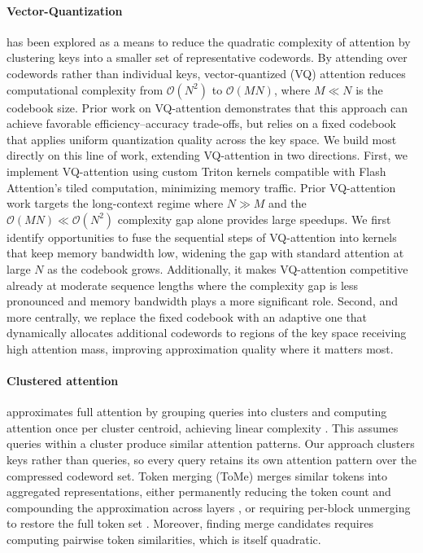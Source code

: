 \paragraph{Vector-Quantization}
has been explored as a means to reduce the quadratic complexity of attention by clustering keys into a smaller set of representative codewords. By attending over codewords rather than individual keys, vector-quantized (VQ) attention reduces computational complexity from $\mathcal{O}(N^2)$ to $\mathcal{O}(MN)$, where $M \ll N$ is the codebook size. Prior work on VQ-attention \cite{lingletransformer} demonstrates that this approach can achieve favorable efficiency–accuracy trade-offs, but relies on a fixed codebook that applies uniform quantization quality across the key space. We build most directly on this line of work, extending VQ-attention in two directions. First, we implement VQ-attention using custom Triton kernels compatible with Flash Attention's tiled computation, minimizing memory traffic. 
Prior VQ-attention work targets the long-context regime where $N \gg M$ and the $\mathcal{O}(MN) \ll \mathcal{O}(N^2)$ complexity gap alone provides large speedups. We first identify opportunities to fuse the sequential steps of VQ-attention into kernels that keep memory bandwidth low, widening the gap with standard attention at large $N$ as the codebook grows. Additionally, it makes VQ-attention competitive already at moderate sequence lengths where the complexity gap is less pronounced and memory bandwidth plays a more significant role. Second, and more centrally, we replace the fixed codebook with an adaptive one that dynamically allocates additional codewords to regions of the key space receiving high attention mass, improving approximation quality where it matters most.
\paragraph{Clustered attention}
approximates full attention by grouping queries into clusters and computing attention once per cluster centroid, achieving linear complexity \cite{vyas2020fast}. This assumes queries within a cluster produce similar attention patterns. Our approach clusters keys rather than queries, so every query retains its own attention pattern over the compressed codeword set. Token merging (ToMe) merges similar tokens into aggregated representations, either permanently reducing the token count and compounding the approximation across layers \cite{bolya2022tokenmerging}, or requiring per-block unmerging to restore the full token set \cite{bolya2023tomesd}. Moreover, finding merge candidates requires computing pairwise token similarities, which is itself quadratic.
